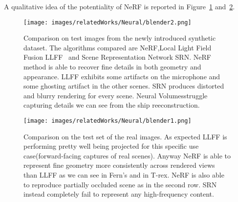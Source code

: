 A qualitative idea of the potentiality of NeRF is reported in Figure~\ref{fig:blender2} and~\ref{fig:blender1}.
\begin{figure}[H]
    \centering
    \texttt{[image: images/relatedWorks/Neural/blender2.png]} 
    \caption{Comparison on test images from the newly introduced
    synthetic dataset. The algorithms compared are NeRF,Local Light Field Fusion LLFF~\cite{LLFF} and Scene
    Representation Network SRN. NeRF method is able to recover fine details in both geometry
    and appearance. LLFF exhibits some artifacts on the microphone and some ghosting
    artifact in the other scenes. SRN produces distorted and blurry rendering for every
    scene. Neural Volumesstruggle capturing details we can see from
    the ship reeconstruction.}\label{fig:blender2}
\end{figure}

\begin{figure}[H]
    \centering
    \texttt{[image: images/relatedWorks/Neural/blender1.png]} 
    \caption{Comparison on the test set of the real images.
    As expected LLFF is performing pretty well being projected
    for this specific use case(forward-facing captures of real scenes).
    Anyway NeRF is able to represent fine geometry more consistently across
    rendered views than LLFF as we can see in Fern's and in T-rex. NeRF
    is also able to reproduce partially occluded scene as in the second row.
    SRN instead completely fail to represent any high-frequency content.}\label{fig:blender1}
\end{figure}
%
%
